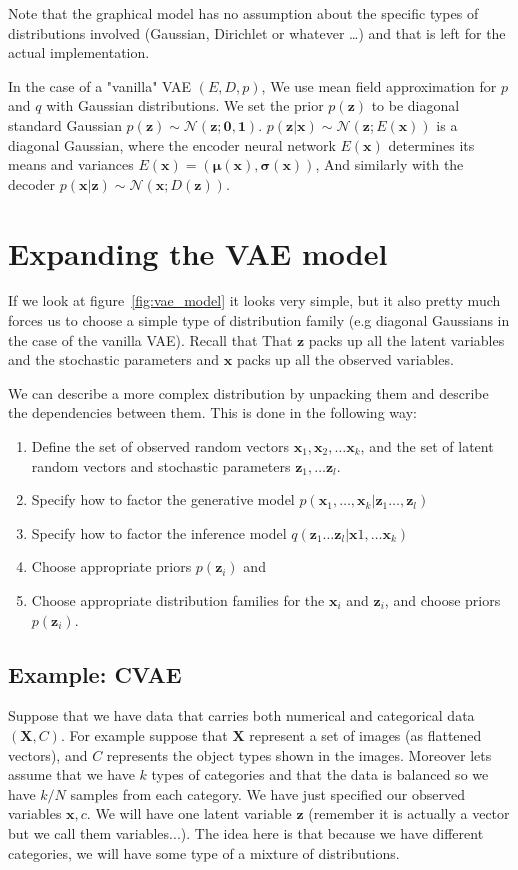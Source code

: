 \documentclass[11pt, a4paper]{report}
\theoremstyle{plain}
\theoremstyle{definition}
\newtheorem{mydef}{Definition}[chapter]
\theoremstyle{remark}
\newcommand{\X}{\mathbf{X}}
\newcommand{\x}{\mathbf{x}}
\newcommand{\z}{\mathbf{z}}
\newcommand{\NN}{\mathcal{N}}
\newcommand{\bv}[1]{\boldsymbol{#1}}
\begin{document}
Note that the graphical model has no assumption about the specific types of
distributions involved (Gaussian, Dirichlet or whatever \dots) and that is left
for the actual implementation.

In the case of a "vanilla" VAE $(E,D,p)$, 
We use mean field approximation for $p$ and $q$ with Gaussian distributions.
We set the prior $p(\z)$ to be diagonal standard Gaussian
$p(\z) \sim \NN(\z ; \bv{0},\bv{1})$.
$p(\z | \x) \sim \NN(\z ;E(\x))$ is a diagonal Gaussian, where the encoder
neural network $E(\x)$ 
determines its means and variances $E(\x) = (\bv{\mu}(\x), \bv{\sigma}(\x))$, 
And similarly with the decoder $p(\x | \z) \sim \NN(\x ;D(\z))$.



\section{Expanding the VAE model}
If we look at figure~\ref{fig:vae_model} it looks very simple, but it also
pretty much forces us to choose a simple type of distribution family (e.g
diagonal Gaussians in the case of the vanilla VAE).
Recall that That $\z$ packs up all the latent variables and the stochastic
parameters and $\x$ packs up all the observed variables.

We can describe a more complex distribution by unpacking them and describe the
dependencies between them.
This is done in the following way:
\label{VAE-specs}
\begin{enumerate}
\item{} Define the set of observed random vectors $\x_1, \x_2, \dots \x_k$, and 
the set of latent random vectors and stochastic parameters $\z_1, \dots \z_l$.
\item{} Specify how to factor the generative model $p(\x_1,\dots, \x_k| \z_1
\dots , \z_l)$
\item{} Specify how to factor the inference model $q(\z_1 \dots \z_l | \x1,
\dots \x_k)$
\item{} Choose appropriate priors $p(\z_i)$ and
\item{} Choose appropriate distribution families for the $\x_i$ and $\z_i$,
and choose priors $p(\z_i)$.
\end{enumerate}

\subsection{Example: CVAE}
Suppose that we have data that carries both numerical and categorical data $(\X,
C)$.
For example suppose that $\X$ represent a set of images (as flattened vectors),
and $C$ represents the object types shown in the images.
Moreover lets assume that we have $k$ types of categories and that the data is
balanced so we have $k/N$ samples from each category.
We have just specified our observed variables $\x, c$.
We will have one latent variable $\z$ (remember it is actually a vector but we
call them variables...).
The idea here is that because we have different categories, we will have some
type of a mixture of distributions.
\end{document}
